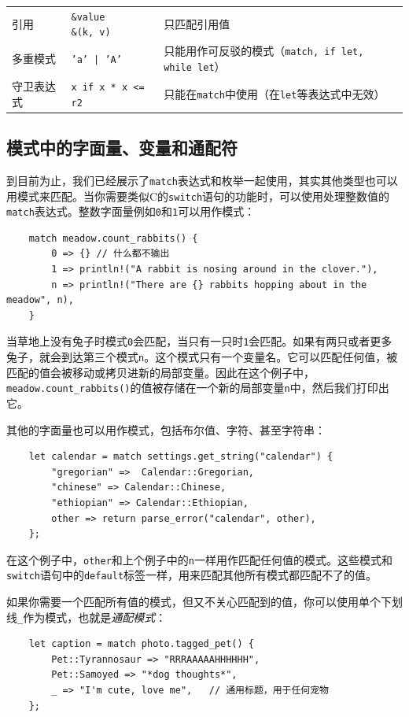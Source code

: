 \begin{table}[htbp]
\begin{tabular}{p{}p{}p{}}
        \rowcolor{tablecolor}
        引用    & \makecell[l]{\texttt{\&value} \\ \texttt{\&(k, v)}}   & 只匹配引用值 \\
        多重模式    & \texttt{'a' | 'A'}    & 只能用作可反驳的模式（\texttt{match, if let, while let}） \\
        \rowcolor{tablecolor}
        守卫表达式  & \texttt{x if x * x <= r2} & 只能在\texttt{match}中使用（在\texttt{let}等表达式中无效） \\
    \end{tabular}
\end{table}

\subsection{模式中的字面量、变量和通配符}
到目前为止，我们已经展示了\texttt{match}表达式和枚举一起使用，其实其他类型也可以用模式来匹配。当你需要类似C的\texttt{switch}语句的功能时，可以使用处理整数值的\texttt{match}表达式。整数字面量例如\texttt{0}和\texttt{1}可以用作模式：
\begin{verbatim}
    match meadow.count_rabbits() {
        0 => {} // 什么都不输出
        1 => println!("A rabbit is nosing around in the clover."),
        n => println!("There are {} rabbits hopping about in the meadow", n),
    }
\end{verbatim}

当草地上没有兔子时模式\texttt{0}会匹配，当只有一只时\texttt{1}会匹配。如果有两只或者更多兔子，就会到达第三个模式\texttt{n}。这个模式只有一个变量名。它可以匹配任何值，被匹配的值会被移动或拷贝进新的局部变量。因此在这个例子中，\texttt{meadow.count\_rabbits()}的值被存储在一个新的局部变量\texttt{n}中，然后我们打印出它。

其他的字面量也可以用作模式，包括布尔值、字符、甚至字符串：
\begin{verbatim}
    let calendar = match settings.get_string("calendar") {
        "gregorian" =>  Calendar::Gregorian,
        "chinese" => Calendar::Chinese,
        "ethiopian" => Calendar::Ethiopian,
        other => return parse_error("calendar", other),
    };
\end{verbatim}

在这个例子中，\texttt{other}和上个例子中的\texttt{n}一样用作匹配任何值的模式。这些模式和\texttt{switch}语句中的\texttt{default}标签一样，用来匹配其他所有模式都匹配不了的值。

如果你需要一个匹配所有值的模式，但又不关心匹配到的值，你可以使用单个下划线\texttt{\_}作为模式，也就是\emph{通配模式}：
\begin{verbatim}
    let caption = match photo.tagged_pet() {
        Pet::Tyrannosaur => "RRRAAAAAHHHHHH",
        Pet::Samoyed => "*dog thoughts*",
        _ => "I'm cute, love me",   // 通用标题，用于任何宠物
    };
\end{verbatim}

